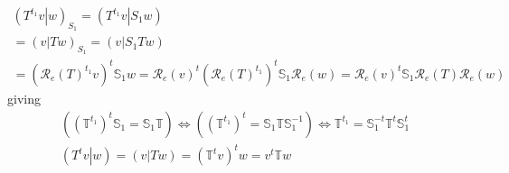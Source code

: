 \documentclass[aps,preprint]{revtex4}
\begin{document}
\begin{gather}
\left( \left. T^{t_{1}}v\right\vert w\right) _{S_{1}}=\left( \left.
T^{t_{1}}v\right\vert S_{1}w\right) \\
=\left( \left. v\right\vert Tw\right) _{S_{1}}=\left( \left. v\right\vert
S_{1}Tw\right) \\
=\left( \mathcal{R}_{e}\left( T\right) ^{t_{1}}v\right) ^{t}\mathbb{S}_{1}w=%
\mathcal{R}_{e}\left( v\right) ^{t}\left( \mathcal{R}_{e}\left( T\right)
^{t_{1}}\right) ^{t}\mathbb{S}_{1}\mathcal{R}_{e}\left( w\right) =\mathcal{R}%
_{e}\left( v\right) ^{t}\mathbb{S}_{1}\mathcal{R}_{e}\left( T\right) 
\mathcal{R}_{e}\left( w\right)
\end{gather}%
giving%
\begin{gather}
\left( \left( \mathbb{T}^{t_{1}}\right) ^{t}\mathbb{S}_{1}=\mathbb{S}_{1}%
\mathbb{T}\right) \Leftrightarrow \left( \left( \mathbb{T}^{t_{1}}\right)
^{t}=\mathbb{S}_{1}\mathbb{TS}_{1}^{-1}\right) \Leftrightarrow \mathbb{T}%
^{t_{1}}=\mathbb{S}_{1}^{-t}\mathbb{T}^{t}\mathbb{S}_{1}^{t} \\
\left( \left. T^{t}v\right\vert w\right) =\left( \left. v\right\vert
Tw\right) =\left( \mathbb{T}^{t}v\right) ^{t}w=v^{t}\mathbb{T}w
\end{gather}
\end{document}
